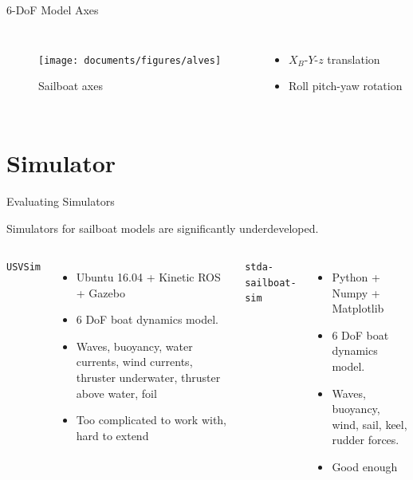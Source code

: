 \documentclass[10pt,xcolor={table,dvipsnames},t]{beamer}
\begin{document}
\begin{frame}{6-DoF Model Axes}
\begin{columns}
\begin{figure}
    \centering
    \texttt{[image: documents/figures/alves]}
    \caption{Sailboat axes~\cite{Alves2010}}
    \label{fig:my_label}
\end{figure}
\begin{itemize}
    \item  \(X_B\)-\(Y\)-\(z\) translation
    \item Roll \-pitch-yaw rotation
\end{itemize}
\end{columns}

    
\end{frame}




\section{Simulator}
\begin{frame}{Evaluating Simulators}
    
    
    Simulators for sailboat models are significantly underdeveloped.
    
    \begin{columns}
        \centerline{\texttt{USVSim} \cite{Paravisi2019}}
        \begin{itemize}
            \item Ubuntu 16.04 + Kinetic ROS + Gazebo
            \item 6 DoF boat dynamics model.
            \item Waves, buoyancy, water currents, wind currents, thruster underwater, thruster above water, foil
            \item Too complicated to work with, hard to extend
        \end{itemize}
        \centerline{\texttt{stda-sailboat-sim} \cite{Buehler2018}}
        \begin{itemize}
            \item Python + Numpy + Matplotlib
            \item 6 DoF boat dynamics model.
            \item Waves, buoyancy, wind, sail, keel, rudder forces.
            \item Good enough 
        \end{itemize}
    \end{columns}
    
\end{frame}
\end{document}
